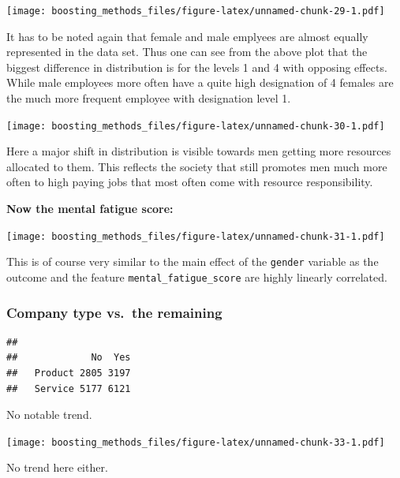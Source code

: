 \documentclass[
]{book}
\newenvironment{Shaded}{\begin{snugshade}}{\end{snugshade}}
\newcommand{\CommentTok}[1]{\textcolor[rgb]{0.56,0.35,0.01}{\textit{#1}}}
\newcommand{\FunctionTok}[1]{\textcolor[rgb]{0.00,0.00,0.00}{#1}}
\newcommand{\NormalTok}[1]{#1}
\newcommand{\SpecialCharTok}[1]{\textcolor[rgb]{0.00,0.00,0.00}{#1}}
\begin{document}
\texttt{[image: boosting\_methods\_files/figure-latex/unnamed-chunk-29-1.pdf]}

It has to be noted again that female and male emplyees are almost equally represented in the data set. Thus one can see from the above plot that the biggest difference in distribution is for the levels 1 and 4 with opposing effects. While male employees more often have a quite high designation of 4 females are the much more frequent employee with designation level 1.

\texttt{[image: boosting\_methods\_files/figure-latex/unnamed-chunk-30-1.pdf]}

Here a major shift in distribution is visible towards men getting more resources allocated to them. This reflects the society that still promotes men much more often to high paying jobs that most often come with resource responsibility.

\textbf{Now the mental fatigue score:}

\texttt{[image: boosting\_methods\_files/figure-latex/unnamed-chunk-31-1.pdf]}

This is of course very similar to the main effect of the \texttt{gender} variable as the outcome and the feature \texttt{mental\_fatigue\_score} are highly linearly correlated.

\hypertarget{company-type-vs.-the-remaining}{%
\subsubsection{Company type vs.~the remaining}\label{company-type-vs.-the-remaining}}

\begin{Shaded}
\end{Shaded}

\begin{verbatim}
##          
##             No  Yes
##   Product 2805 3197
##   Service 5177 6121
\end{verbatim}

No notable trend.

\texttt{[image: boosting\_methods\_files/figure-latex/unnamed-chunk-33-1.pdf]}

No trend here either.
\end{document}
